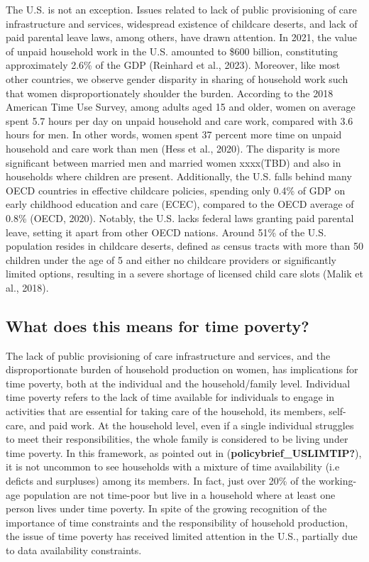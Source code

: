 \documentclass[
  11pt,
]{article}
\begin{document}
The U.S. is not an exception. Issues related to lack of public
provisioning of care infrastructure and services, widespread existence
of childcare deserts, and lack of paid parental leave laws, among
others, have drawn attention. In 2021, the value of unpaid household
work in the U.S. amounted to \$600 billion, constituting approximately
2.6\% of the GDP (Reinhard et al., 2023). Moreover, like most other
countries, we observe gender disparity in sharing of household work such
that women disproportionately shoulder the burden. According to the 2018
American Time Use Survey, among adults aged 15 and older, women on
average spent 5.7 hours per day on unpaid household and care work,
compared with 3.6 hours for men. In other words, women spent 37 percent
more time on unpaid household and care work than men (Hess et al.,
2020). The disparity is more significant between married men and married
women xxxx(TBD) and also in households where children are present.
Additionally, the U.S. falls behind many OECD countries in effective
childcare policies, spending only 0.4\% of GDP on early childhood
education and care (ECEC), compared to the OECD average of 0.8\% (OECD,
2020). Notably, the U.S. lacks federal laws granting paid parental
leave, setting it apart from other OECD nations. Around 51\% of the U.S.
population resides in childcare deserts, defined as census tracts with
more than 50 children under the age of 5 and either no childcare
providers or significantly limited options, resulting in a severe
shortage of licensed child care slots (Malik et al., 2018).

\subsection{What does this means for time
poverty?}\label{what-does-this-means-for-time-poverty}

The lack of public provisioning of care infrastructure and services, and
the disproportionate burden of household production on women, has
implications for time poverty, both at the individual and the
household/family level. Individual time poverty refers to the lack of
time available for individuals to engage in activities that are
essential for taking care of the household, its members, self-care, and
paid work. At the household level, even if a single individual struggles
to meet their responsibilities, the whole family is considered to be
living under time poverty. In this framework, as pointed out in
(\textbf{policybrief\_USLIMTIP?}), it is not uncommon to see households
with a mixture of time availability (i.e deficts and surpluses) among
its members. In fact, just over 20\% of the working-age population are
not time-poor but live in a household where at least one person lives
under time poverty. In spite of the growing recognition of the
importance of time constraints and the responsibility of household
production, the issue of time poverty has received limited attention in
the U.S., partially due to data availability constraints.
\end{document}
